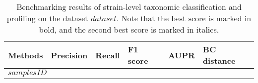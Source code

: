 
\begin{table}[ht]
\renewcommand\arraystretch{1.}
    \centering
    \small
    \setlength\tabcolsep{2pt} 
    \begin{tabular}{p{} p{1.5cm}<{\centering} p{1.5cm}<{\centering} p{1.5cm}<{\centering} p{1.5cm}<{\centering} p{1.5cm}<{\centering} }

    \toprule
    Methods & Precision & Recall & F1 score & AUPR & BC distance \\ 
    \midrule
    \multicolumn{4}{l}{$samplesID$} \\
    \hline     
\bottomrule
    \end{tabular}
    \vspace{1mm}
    \caption{Benchmarking results of strain-level taxonomic classification and profiling on the dataset $dataset$. Note that the best score is marked in bold, and the second best score is marked in italics.}
    \label{tab:res_strain_$dataset$}
\end{table}
    